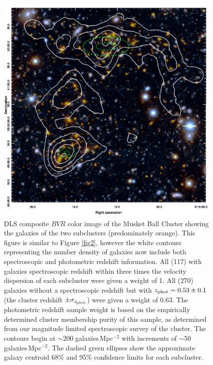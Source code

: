 \begin{figure}
\centering
\includegraphics[width=5in]{Chapter4/DLScolor_wGalDenCon.png}
\caption[Musket Ball Cluster galaxy number density map including spectroscopic redshift information.]{
DLS composite $BVR$ color image of the Musket Ball Cluster showing  the galaxies of the two subclusters (predominately orange). 
This figure is similar to Figure \ref{fig2}, however the white contours representing the number density of galaxies now include both spectroscopic and photometric redshift information.
All (117) with galaxies spectroscopic redshift within three times the velocity dispersion of each subcluster were given a weight of 1.
All (270) galaxies without a spectroscopic redshift but with $z_{\rm phot}=0.53\pm0.1$ (the cluster redshift $\pm\sigma_{z_{\rm phot}}$) were given a weight of 0.63.
The photometric redshift sample weight is based on the empirically determined cluster membership purity of this sample, as determined from our magnitude limited spectroscopic survey of the cluster.
The contours begin at $\sim$200 galaxies\,Mpc$^{-2}$ with increments of $\sim$50 galaxies\,Mpc$^{-2}$.
The dashed green ellipses show the approximate galaxy centroid 68\% and 95\% confidence limits for each subcluster.
}
\label{figure:GalDenMap_withspec}
\end{figure}


